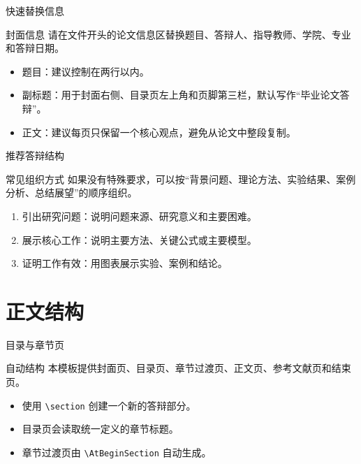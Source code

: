 \documentclass[12pt,aspectratio=43]{beamer}
\newcommand{\JLUEmph}[1]{{\JLUHei #1}}
\newcommand{\JLUSectionTitleTwo}{正文结构}
\begin{document}
\begin{frame}{快速替换信息}
  \begin{block}{封面信息}
    请在文件开头的论文信息区替换题目、答辩人、指导教师、学院、专业和答辩日期。
  \end{block}

  \begin{itemize}
    \item \JLUEmph{题目}：建议控制在两行以内。
    \item \JLUEmph{副标题}：用于封面右侧、目录页左上角和页脚第三栏，默认写作“毕业论文答辩”。
    \item \JLUEmph{正文}：建议每页只保留一个核心观点，避免从论文中整段复制。
  \end{itemize}
\end{frame}

\begin{frame}{推荐答辩结构}
  \begin{block}{常见组织方式}
    如果没有特殊要求，可以按“背景问题、理论方法、实验结果、案例分析、总结展望”的顺序组织。
  \end{block}

  \begin{enumerate}
    \item 引出研究问题：说明问题来源、研究意义和主要困难。
    \item 展示核心工作：说明主要方法、关键公式或主要模型。
    \item 证明工作有效：用图表展示实验、案例和结论。
  \end{enumerate}
\end{frame}

\section{\JLUSectionTitleTwo}

\begin{frame}{目录与章节页}
  \begin{block}{自动结构}
    本模板提供封面页、目录页、章节过渡页、正文页、参考文献页和结束页。
  \end{block}

  \begin{itemize}
    \item 使用 \texttt{\textbackslash section} 创建一个新的答辩部分。
    \item 目录页会读取统一定义的章节标题。
    \item 章节过渡页由 \texttt{\textbackslash AtBeginSection} 自动生成。
  \end{itemize}
\end{frame}
\end{document}
